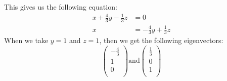 \documentclass[a4paper]{article}
\begin{document}
This gives us the following equation:
\begin{align*}
  x + \frac{4}{3}y - \frac{1}{3}z &= 0 \\
  x &= - \frac{4}{3}y + \frac{1}{3}z
\end{align*}
When we take $y = 1$ and $z = 1$, then we get the following eigenvectors:
\[
\left(
\begin{array}{r}
- \frac{4}{3} \\
1 \\
0 \\
\end{array}
\right)
\text{and}
\left(
\begin{array}{r}
\frac{1}{3} \\
0 \\
1 \\
\end{array}
\right)
\]
\end{document}
